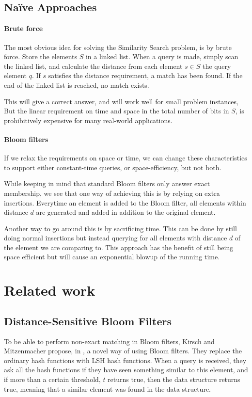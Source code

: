 \documentclass[a4paper,11pt]{article}
\begin{document}
\subsection{Naïve Approaches}

\paragraph{Brute force}
The most obvious idea for solving the Similarity Search problem, is by brute force. Store the elements $S$ in a linked list. When a query is made, simply scan the linked list, and calculate the distance from each element $s \in S$ the query element $q$. If $s$ satisfies the distance requirement, a match has been found. If the end of the linked list is reached, no match exists.

This will give a correct answer, and will work well for small problem instances, But the linear requirement on time and space in the total number of bits in $S$, is prohibitively expensive for many real-world applications.

\paragraph{Bloom filters} If we relax the requirements on space or time, we can change these characteristics to support either constant-time queries, or space-efficiency, but not both. 

While keeping in mind that standard Bloom filters only answer exact membership, we see that one way of achieving this is by relying on extra insertions. Everytime an element is added to the Bloom filter, all elements within distance $d$ are generated and added in addition to the original element. 

Another way to go around this is by sacrificing time. This can be done by still doing normal insertions but instead querying for all elements with distance $d$ of the element we are comparing to. This approach has the benefit of still being space efficient but will cause an exponential blowup of the running time.

\section{Related work} %

\subsection{Distance-Sensitive Bloom Filters}
To be able to perform non-exact matching in Bloom filters, Kirsch and Mitzenmacher propose, in \cite{paper:harvard}, a novel way of using Bloom filters. They replace the ordinary hash functions with LSH hash functions. When a query is received, they ask all the hash functions if they have seen something similar to this element, and if more than a certain threshold, $t$ returns true, then the data structure returns true, meaning that a similar element was found in the data structure.
\end{document}
